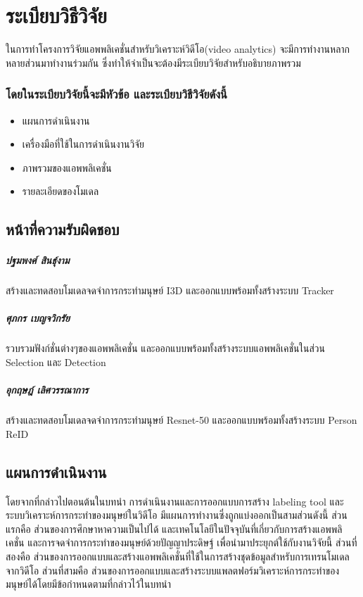 \chapter{ระเบียบวิธีวิจัย}
ในการทําโครงการวิจัยแอพพลิเคชั่นสำหรับวิเคราะห์วิดีโอ(video analytics) จะมีการทำงานหลากหลายส่วนมาทำงานร่วมกัน ซึ่งทำให้จำเป็นจะต้องมีระเบียบวิจัยสำหรับอธิบายภาพรวม
\subsection*{โดยในระเบียบวิจัยนี้จะมีหัวข้อ และระเบียบวิธีวิจัยดังนี้}
\begin{itemize}\setlength\itemsep{-0.3em}
	\item แผนการดำเนินงาน
	\item เครื่องมือที่ใช้ในการดำเนินงานวิจัย
	\item ภาพรวมของแอพพลิเคชั่น
	\item รายละเอียดของโมเดล
\end{itemize}
\vspace{3mm}
\section{หน้าที่ความรับผิดชอบ} 
\paragraph*{ปฐมพงศ์ สินธุ์งาม}
สร้างและทดสอบโมเดลจดจำการกระทำมนุษย์ I3D และออกแบบพร้อมทั้งสร้างระบบ Tracker
\paragraph*{ศุภกร เบญจวิกรัย}
รวบรวมฟังก์ชั่นต่างๆของแอพพลิเคชั่น และออกแบบพร้อมทั้งสร้างระบบแอพพลิเคชั่นในส่วน Selection และ Detection
\paragraph*{อุกฤษฎ์ เลิศวรรณาการ}
สร้างและทดสอบโมเดลจดจำการกระทำมนุษย์ Resnet-50 และออกแบบพร้อมทั้งสร้างระบบ Person ReID 

\vspace{3mm}
\section{แผนการดำเนินงาน}
โดยจากที่กล่าวไปตอนต้นในบทนำ
การดำเนินงานและการออกแบบการสร้าง labeling tool และระบบวิเคราะห์การกระทำของมนุษย์ในวิดีโอ มีแผนการทำงานซึ่งถูกแบ่งออกเป็นสามส่วนดังนี้ 
ส่วนแรกคือ ส่วนของการศึกษาหาความเป็นไปได้ และเทคโนโลยีในปัจจุบันที่เกี่ยวกับการสร้างแอพพลิเคชั่น และการจดจำการกระทำของมนุษย์ด้วยปัญญาประดิษฐ์ เพื่อนำมาประยุกต์ใช้กับงานวิจัยนี้
ส่วนที่สองคือ ส่วนของการออกแบบและสร้างแอพพลิเคชั่นที่ใช้ในการสร้างชุดข้อมูลสำหรับการเทรนโมเดลจากวิดีโอ
ส่วนที่สามคือ ส่วนของการออกแบบและสร้างระบบแพลตฟอร์มวิเคราะห์การกระทำของมนุษย์ได้โดยมีข้อกำหนดตามที่กล่าวไว้ในบทนำ

